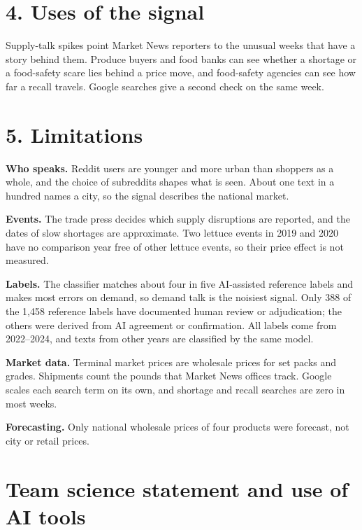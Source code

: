 \documentclass[
  11pt,
]{article}
\begin{document}
\section{4. Uses of the signal}\label{uses-of-the-signal}

Supply-talk spikes point Market News reporters to the unusual weeks that
have a story behind them. Produce buyers and food banks can see whether a
shortage or a food-safety scare lies behind a price move, and food-safety
agencies can see how far a recall travels. Google searches give a second
check on the same week.

\section{5. Limitations}\label{limitations}

\textbf{Who speaks.} Reddit users are younger and more urban than
shoppers as a whole, and the choice of subreddits shapes what is seen.
About one text in a hundred names a city, so the signal describes the
national market.

\textbf{Events.} The trade press decides which supply disruptions are
reported, and the dates of slow shortages are approximate. Two lettuce events in 2019 and 2020 have no comparison
year free of other lettuce events, so their price effect is not measured.

\textbf{Labels.} The classifier matches about four in five AI-assisted
reference labels and makes most errors on demand, so demand talk is the
noisiest signal. Only 388 of the 1,458 reference labels have documented
human review or adjudication; the others were derived from AI agreement
or confirmation. All labels come from 2022--2024, and texts from other
years are classified by the same model.

\textbf{Market data.} Terminal market prices are wholesale prices for set
packs and grades. Shipments count the pounds that Market News offices
track.
Google scales each search term on its own, and shortage and recall
searches are zero in most weeks.

\textbf{Forecasting.} Only national wholesale prices of four products
were forecast, not city or retail prices.


\section{Team science statement and use of AI
tools}\label{team-science-statement-and-use-of-ai-tools}
\end{document}
